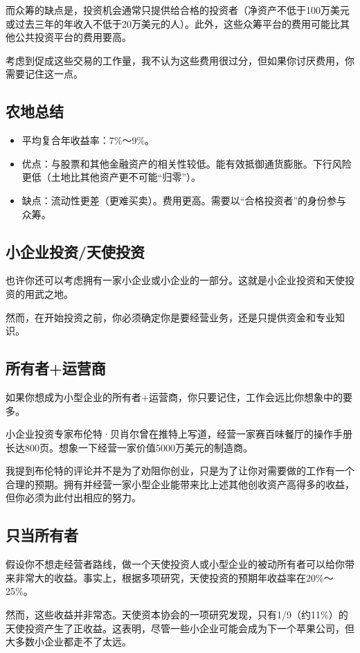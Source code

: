 而众筹的缺点是，投资机会通常只提供给合格的投资者（净资产不低于100万美元或过去三年的年收入不低于20万美元的人）。此外，这些众筹平台的费用可能比其他公共投资平台的费用要高。

考虑到促成这些交易的工作量，我不认为这些费用很过分，但如果你讨厌费用，你需要记住这一点。

\subsection{农地总结}
\begin{itemize}
\item 平均复合年收益率：7\%～9\%。
\item 优点：与股票和其他金融资产的相关性较低。能有效抵御通货膨胀。下行风险更低（土地比其他资产更不可能“归零”）。
\item 缺点：流动性更差（更难买卖）。费用更高。需要以“合格投资者”的身份参与众筹。
\end{itemize}
\subsection{小企业投资/天使投资}
也许你还可以考虑拥有一家小企业或小企业的一部分。这就是小企业投资和天使投资的用武之地。

然而，在开始投资之前，你必须确定你是要经营业务，还是只提供资金和专业知识。

\subsection{所有者+运营商}
如果你想成为小型企业的所有者+运营商，你只要记住，工作会远比你想象中的要多。

小企业投资专家布伦特·贝肖尔曾在推特上写道，经营一家赛百味餐厅的操作手册长达800页。想象一下经营一家价值5000万美元的制造商。

我提到布伦特的评论并不是为了劝阻你创业，只是为了让你对需要做的工作有一个合理的预期。拥有并经营一家小型企业能带来比上述其他创收资产高得多的收益，但你必须为此付出相应的努力。

\subsection{只当所有者}
假设你不想走经营者路线，做一个天使投资人或小型企业的被动所有者可以给你带来非常大的收益。事实上，根据多项研究，天使投资的预期年收益率在20\%～25\%。

然而，这些收益并非常态。天使资本协会的一项研究发现，只有1/9（约11\%）的天使投资产生了正收益。这表明，尽管一些小企业可能会成为下一个苹果公司，但大多数小企业都走不了太远。

